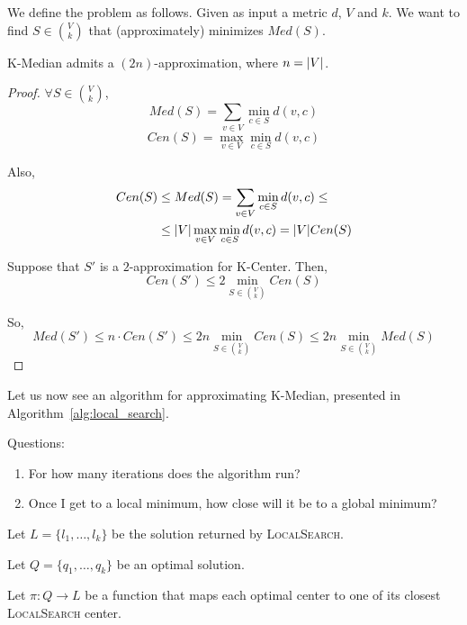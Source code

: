     We define the problem as follows.
    Given as input a metric $d$, $V$ and $k$.
    We want to find $S \in \binom{V}{k}$ that (approximately) minimizes $Med(S)$.

    \begin{observation}
        K-Median admits a $(2n)$-approximation, where $n = \vert V \vert$.
    \end{observation}

    \begin{proof}
        $\forall S \in \binom{V}{k}$,
        \[ Med(S) = \sum_{v \in V} \min_{c \in S} d(v,c) \]
        \[ Cen(S) = \max_{v \in V} \min_{c \in S} d(v,c) \]

        Also,
        \begin{equation*}
            \begin{split}
                Cen(S) &\leq Med(S) = \sum_{v \in V} \min_{c \in S} d(v,c) \leq\\
                    &\leq \vert V \vert \max_{v \in V} \min_{c \in S} d(v,c) = \vert V \vert Cen(S)
            \end{split}
        \end{equation*}

        Suppose that $S'$ is a $2$-approximation for K-Center.
        Then,
        \[ Cen(S') \leq 2 \min_{S \in \binom{V}{k}} Cen(S) \]

        So,
        \[ Med(S') \leq n \cdot Cen(S') \leq 2n \min_{S \in \binom{V}{k}} Cen(S) \leq 2n \min_{S \in \binom{V}{k}} Med(S)  \]
    \end{proof}

    Let us now see an algorithm for approximating K-Median, presented in Algorithm~\ref{alg:local_search}.

    

    Questions:
    \begin{enumerate}
        \item For how many iterations does the algorithm run?
        \item Once I get to a local minimum, how close will it be to a global minimum?
    \end{enumerate}

    Let $L = \{ l_1, \dots, l_k \}$ be the solution returned by \textsc{LocalSearch}.

    Let $Q = \{q_1, \dots, q_k\}$ be an optimal solution.

    Let $\pi : Q \rightarrow L$ be a function that maps each optimal center to one of its closest \textsc{LocalSearch} center.

